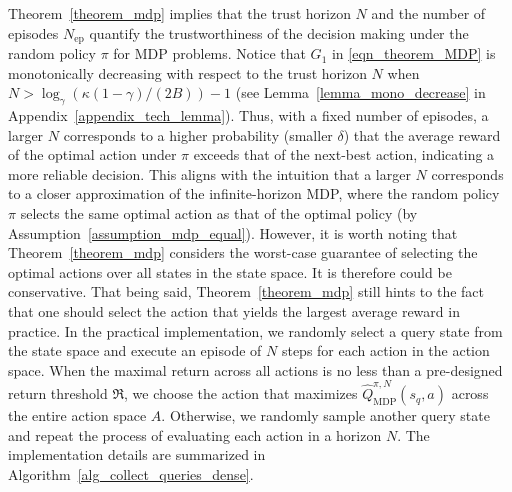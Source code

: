Theorem~\ref{theorem_mdp} implies that the trust horizon $N$ and the number of episodes $N_\text{ep}$ quantify the trustworthiness of the decision making under the random policy $\pi$ for MDP problems. Notice that $G_1$ in \eqref{eqn_theorem_MDP} is monotonically decreasing with respect to the trust horizon $N$ when $N > \log_\gamma \left( \kappa (1-\gamma)/(2B) \right)-1$ (see Lemma~\ref{lemma_mono_decrease} in Appendix~\ref{appendix_tech_lemma}). Thus, with a fixed number of episodes, a larger $N$ corresponds to a higher probability (smaller $\delta$) that the average reward of the optimal action under $\pi$ exceeds that of the next-best action, indicating a more reliable decision.
%
%
This aligns with the intuition that a larger $N$ corresponds to a closer approximation of the infinite-horizon MDP, where the random policy $\pi$ selects the same optimal action as that of the optimal policy (by Assumption~\ref{assumption_mdp_equal}).
%
However, it is worth noting that Theorem~\ref{theorem_mdp} considers the worst-case guarantee of selecting the optimal actions over all states in the state space. It is therefore could be conservative. That being said, Theorem~\ref{theorem_mdp} still hints to the fact that one should select the action that yields the largest average reward in practice.
%
%
In the practical implementation, we randomly select a query state from the state space and execute an episode of $N$ steps for each action in the action space. When the maximal return across all actions is no less than a pre-designed return threshold $\mathfrak{R}$, we choose the action that maximizes $\hat{Q}_\text{MDP}^{\pi, N}(s_q, a)$ across the entire action space $A$. Otherwise, we randomly sample another query state and repeat the process of evaluating each action in a horizon $N$. The implementation details are summarized in Algorithm~\ref{alg_collect_queries_dense}.
%
%





